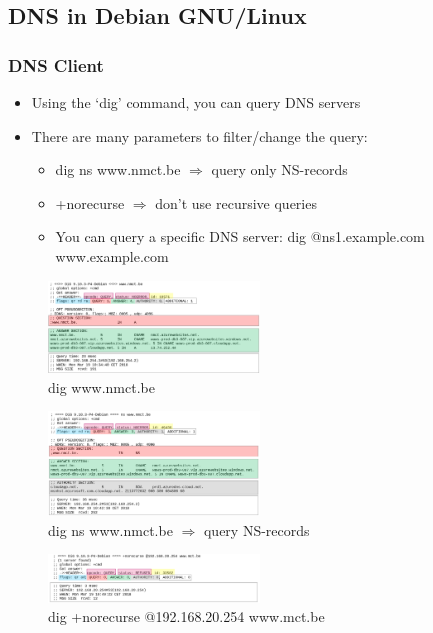 \documentclass{article}
\begin{document}
\subsection{DNS in Debian GNU/Linux}

\subsubsection{DNS Client}

\begin{itemize}
    \item Using the `dig' command, you can query DNS servers
    \item There are many parameters to filter/change the query:
    \begin{itemize}
        \item dig ns www.nmct.be $\Rightarrow$ query only NS-records
        \item +norecurse $\Rightarrow$ don't use recursive queries
        \item You can query a specific DNS server: dig @ns1.example.com www.example.com
    \end{itemize}
\end{itemize}

\begin{figure}[H]
    \centering
    \includegraphics[width=0.5\textwidth]{dig1.png}
    \caption{dig www.nmct.be}
\end{figure}

\begin{figure}[H]
    \centering
    \includegraphics[width=0.5\textwidth]{dig2.png}
    \caption{dig ns www.nmct.be $\Rightarrow$ query NS-records}
\end{figure}

\begin{figure}[H]
    \centering
    \includegraphics[width=0.5\textwidth]{dig3.png}
    \caption{dig +norecurse @192.168.20.254 www.mct.be}
\end{figure}
\end{document}

